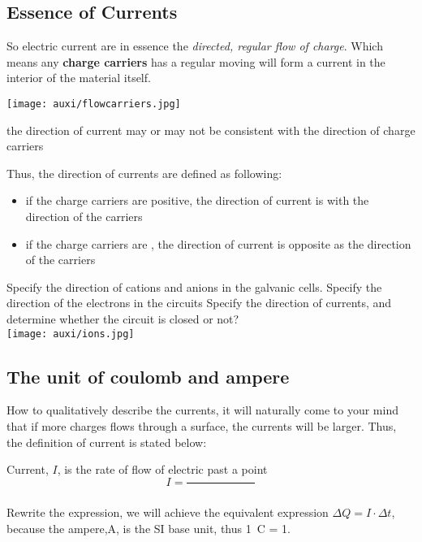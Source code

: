 \documentclass[a4paper]{tufte-handout}
\newenvironment{TaskBox} %
{\begin{tcolorbox}[breakable,colback=b1!30,colframe=b1,title=Task]} {\end{tcolorbox}}
\newenvironment{SummBox}
{\begin{tcolorbox}[breakable,colback=r1!30,colframe=r1,title=Summary]} {\end{tcolorbox}}
\begin{document}
\subsection{Essence of Currents}
So electric current are in essence the \emph{directed, regular flow of charge}. Which means any \textbf{charge carriers} has a regular moving will form a current in the interior of the material itself.
\begin{marginfigure}[-3cm]
\texttt{[image: auxi/flowcarriers.jpg]}
\caption{the direction of current may or may not be consistent with the direction of charge carriers}
\end{marginfigure}
Thus, the direction of currents are defined as following:
\begin{itemize}
  \item if the charge carriers are positive, the direction of current is \uline{\hspace{1in}} with the direction of the carriers
  \item if the charge carriers are \uline{\hspace{1in}}, the direction of current is opposite as the direction of the carriers
\end{itemize}

\begin{TaskBox}
Specify the direction of cations and anions in the galvanic cells.
Specify the direction of the electrons in the circuits
Specify the direction of currents, and determine whether the circuit is closed or not?\\

\texttt{[image: auxi/ions.jpg]}
\vspace{1in}
\end{TaskBox}

\subsection{The unit of coulomb and ampere}
How to qualitatively describe the currents, it will naturally come to your mind that if more charges flows through a surface, the currents will be larger. Thus, the definition of current is stated below:
\begin{SummBox}
Current, $I$, is the rate of flow of electric \uline{\hspace{1in}} past a point\\
\[
  I = \frac{}{\hspace{1in}}
\]
\end{SummBox}
Rewrite the expression, we will achieve the equivalent expression $\Delta Q=I \cdot \Delta t$, because the ampere,\si{\A}, is the SI base unit, thus \SI{1}{C} = 1\uline{\hspace{1in}}.
\end{document}
